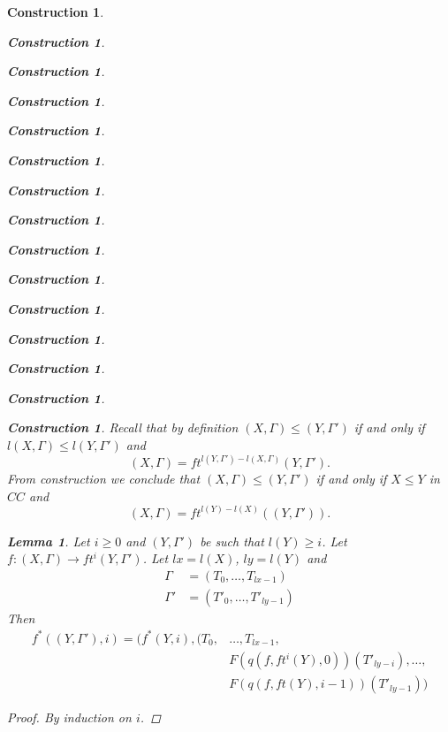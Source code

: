 \documentclass[onecolumn,12pt]{amsart}
\newtheorem{lemma}[proposition]{Lemma}
\numberwithin{proposition}{subsection}
\newtheorem{construction}[proposition]{Construction}
\newcommand{\sr}{\rightarrow}
\begin{document}
\begin{construction}
\begin{construction}
\begin{construction}
\begin{construction}
\begin{construction}
\begin{construction}
\begin{construction}
\begin{construction}
\begin{construction}
\begin{construction}
\begin{construction}
\begin{construction}
\begin{construction}
\begin{construction}
\begin{construction}
Recall that by definition $(X,\Gamma)\le (Y,\Gamma')$ if and only if $l(X,\Gamma)\le l(Y,\Gamma')$ and 
%
$$(X,\Gamma)=ft^{l(Y,\Gamma')-l(X,\Gamma)}(Y,\Gamma').$$
%
From construction we conclude that $(X,\Gamma)\le (Y,\Gamma')$ if and only if $X\le Y$ in $CC$ and 
%
$$(X,\Gamma)=ft^{l(Y)-l(X)}((Y,\Gamma')).$$ 
%
\begin{lemma}
\label{2016.01.31.l1} 
Let $i\ge 0$ and $(Y,\Gamma')$ be such that $l(Y)\ge i$. 
Let $f:(X,\Gamma)\sr ft^i(Y,\Gamma')$. Let $lx=l(X)$, $ly=l(Y)$ and
%
\begin{equation*}
  \begin{split}
    \Gamma&=(T_0,\dots,T_{lx-1})\\
    \Gamma'&=(T'_0,\dots,T'_{ly-1})
  \end{split}
\end{equation*}
%
Then
%
\begin{equation*}
  \begin{split}
    f^*((Y,\Gamma'),i)=(f^*(Y,i),(T_0,&\dots,T_{lx-1},
    \\&
    F(q(f,ft^i(Y),0))(T'_{ly-i}),\dots,
    \\&
    F(q(f,ft(Y),i-1))(T'_{ly-1}))
  \end{split}
\end{equation*}
%
\end{lemma}
%
\begin{proof}
By induction on $i$.


\end{proof}
\end{construction}
\end{construction}
\end{construction}
\end{construction}
\end{construction}
\end{construction}
\end{construction}
\end{construction}
\end{construction}
\end{construction}
\end{construction}
\end{construction}
\end{construction}
\end{construction}
\end{construction}
\end{document}
